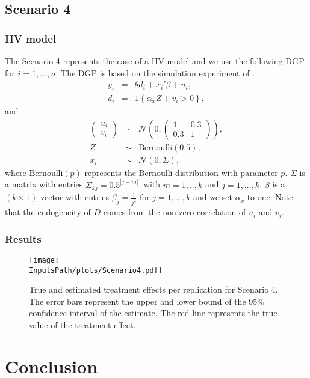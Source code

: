 \documentclass[10pt]{article}
\newcommand*{\InputsFolderPath}{C:/DEV/DML/src/data/}
\newcommand*{\InputsPath}{\InputsFolderPath/20221108}
\begin{document}
\subsection{Scenario 4}
\subsubsection{IIV model}
The Scenario 4 represents the case of a IIV model and we use the following DGP for $i=1,...,n$.
The DGP is based on the simulation experiment of \cite{Farb2020}.
\begin{eqnarray*}\label{dgp_4.1}
y_i &=& \theta d_i + x_i' \beta + u_i, \\	
d_i &=& 1\left\lbrace \alpha_x Z + v_i > 0 \right\rbrace,
\end{eqnarray*}
and
\begin{eqnarray*}\label{dgp_4.2}
\left(\begin{matrix} u_i \\ v_i \end{matrix} \right) &\sim&
\mathcal{N}\left(0, \left(\begin{matrix} 1 & 0.3 \\ 0.3 & 1 \end{matrix} \right) \right), \\
Z &\sim& \text{Bernoulli}(0.5), \\
x_i &\sim& \mathcal{N}(0, \Sigma),
\end{eqnarray*}
where $\text{Bernoulli}(p)$ represents the Bernoulli distribution with parameter $p$. 
$\Sigma$ is a matrix with entries $\Sigma_{kj} = 0.5^{|j-m|}$, with $m=1,..,k$ and $j=1,...,k$.
$\beta$ is a $(k \times 1)$ vector with entries $\beta_j=\frac{1}{j^2}$ for $j=1,...,k$ and we set $\alpha_x$ to one.
Note that the endogeneity of $D$ comes from the non-zero correlation of $u_i$ and $v_i$.
\subsubsection{Results}
\begin{figure}[H]
	\begin{center}
		\texttt{[image: \\InputsPath/plots/Scenario4.pdf]}
		\caption{True and estimated treatment effects per replication for Scenario 4. The error bars represent the upper and lower bound of the 95\% confidence interval of the estimate. The red line represents the true value of the treatment effect.}
		\label{Scenario 4}
	\end{center}
\end{figure}


\section{Conclusion}


	
\end{document}

